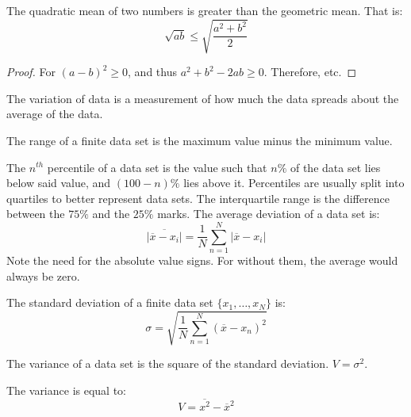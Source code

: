 \documentclass[crop=false,class=article,oneside]{standalone}
\begin{document}
        \begin{theorem}
            The quadratic mean of two numbers is greater
            than the geometric mean. That is:
            \begin{equation*}
                \sqrt{ab}\leq\sqrt{\frac{a^{2}+b^{2}}{2}}
            \end{equation*}
        \end{theorem}
        \begin{proof}
            For $(a-b)^{2}\geq{0}$, and thus
            $a^{2}+b^{2}-2ab\geq{0}$. Therefore, etc.
        \end{proof}
        The variation of data is a measurement of how much
        the data spreads about the average of the data.
        \begin{definition}
            The range of a finite data set is the maximum value
            minus the minimum value.
        \end{definition}
        The $n^{th}$ percentile of a data set is the value such that
        $n\%$ of the data set lies below said value, and
        $(100-n)\%$ lies above it. Percentiles are usually split into
        quartiles to better represent data sets. The interquartile range
        is the difference between the $75\%$ and the $25\%$ marks.
        The average deviation of a data set is:
        \begin{equation*}
            \overline{|\overline{x}-x_{i}|}
            =\frac{1}{N}\sum_{n=1}^{N}|\overline{x}-x_{i}|
        \end{equation*}
        Note the need for the absolute value signs. For without them,
        the average would always be zero.
        \begin{definition}
            The standard deviation of a finite data set
            $\{x_{1},\hdots,x_{N}\}$ is:
            \begin{equation*}
                \sigma=
                \sqrt{\frac{1}{N}\sum_{n=1}^{N}(\overline{x}-x_{n})^{2}}
            \end{equation*}
        \end{definition}
        \begin{definition}
            The variance of a data set is the square of the
            standard deviation. $V=\sigma^{2}$.
        \end{definition}
        \begin{theorem}
            The variance is equal to:
            \begin{equation*}
                V=\overline{x^{2}}-\overline{x}^{2}
            \end{equation*}
        \end{theorem}
\end{document}
